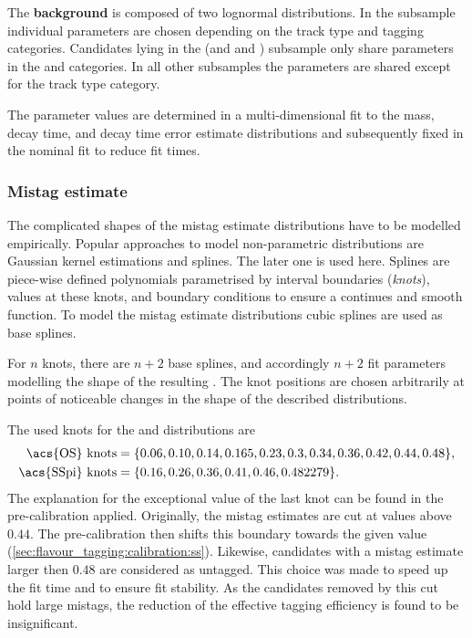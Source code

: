 The \textbf{background} \PDF is composed of two lognormal distributions. In the
\catLL subsample individual parameters are chosen depending on the track type
and tagging categories. Candidates lying in the (\catDD and \catOS and \catAU)
subsample only share parameters in the \catOO and \catOT categories. In all
other subsamples the parameters are shared except for the track type category.

The parameter values are determined in a multi-dimensional fit to the mass,
decay time, and decay time error estimate distributions and subsequently fixed
in the nominal fit to reduce fit times.

\subsubsection{Mistag estimate}
\label{sec:measurement_of_sin2beta:likelihood_fit:model:mistag}

The complicated shapes of the mistag estimate distributions have to be modelled
empirically. Popular approaches to model non-parametric distributions are \eg
Gaussian kernel estimations and splines. The later one is used here. Splines are
piece-wise defined polynomials parametrised by interval boundaries
(\emph{knots}), values at these knots, and boundary conditions to ensure a
continues and smooth function. To model the mistag estimate distributions cubic
splines are used as base splines.

For $n$ knots, there are $n+2$ base splines, and accordingly $n+2$ fit
parameters modelling the shape of the resulting \PDF. The knot positions are
chosen arbitrarily at points of noticeable changes in the shape of the described
distributions.

The used knots for the \obsEtaOS and \obsEtaSS distributions are
%
\begin{equation*}
\begin{split}
  \text{\acs{OS} knots} &= \{0.06, 0.10, 0.14, 0.165, 0.23, 0.3, 0.34, 0.36, 0.42, 0.44, 0.48\} , \\
  \text{\acs{SSpi} knots} &= \{0.16, 0.26, 0.36, 0.41, 0.46, 0.482279\} .
\end{split}
\end{equation*}
%
The explanation for the exceptional value of the last \SSpi knot can be found in
the pre-calibration applied. Originally, the \SSpi mistag estimates are cut at
values above $\num{0.44}$. The pre-calibration then shifts this boundary towards
the given value (\cref{sec:flavour_tagging:calibration:ss}). Likewise,
\OS candidates with a mistag estimate larger then $\num{0.48}$ are considered as
\OS untagged. This choice was made to speed up the fit time and to ensure fit
stability. As the candidates removed by this cut hold large mistags, the
reduction of the effective tagging efficiency is found to be insignificant.

